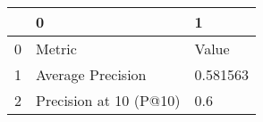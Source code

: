 \begin{tabular}{lll}
\toprule
{} &                       0 &         1 \\
\midrule
0 &                  Metric &     Value \\
1 &       Average Precision &  0.581563 \\
2 &  Precision at 10 (P@10) &       0.6 \\
\bottomrule
\end{tabular}
